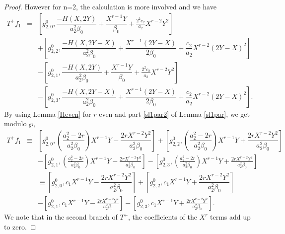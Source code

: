 \documentclass[10pt,a4paper]{amsart}
\begin{document}
\begin{proof}
However for n=2, the calculation is more involved and we have
\begin{eqnarray*}
    T^{+}f_{1} &=& \left[g_{2,0}^{0}, \dfrac{-H(X,2Y)}{a_{2}^2\beta_{0}}+\dfrac{X^{r-1}Y}{\beta_{0}} +\frac{2^2c_{2}}{a_{2}}X^{r-2}Y^2\right]\\ 
    &&+ \left[g_{2,2}^{0}, \dfrac{-H(X,2Y-X)}{a_{2}^2\beta_{0}}+\dfrac{X^{r-1}(2Y-X)}{2\beta_{0}} +\dfrac{c_{2}}{a_{2}}X^{r-2}(2Y-X)^2\right] \\
    &&-\left[g_{2,1}^{0}, \dfrac{-H(X,2Y)}{a_{2}^2\beta_{0}}+\dfrac{X^{r-1}Y}{\beta_{0}}+\frac{2^2c_{2}}{a_2}X^{r-2}Y^2\right] \\ 
    &&-\left[g_{2,3}^{0}, \dfrac{-H(X,2Y-X)}{a_{2}^2\beta_{0}}+\dfrac{X^{r-1}(2Y-X)}{2\beta_{0}}+\dfrac{c_{2}}{a_{2}}X^{r-2}(2Y-X)^2\right]. 
\end{eqnarray*}
By using Lemma \ref{Heven} for $r$ even and part \eqref{sl1par2} of Lemma \ref{sl1par}, we get modulo $\wp$,
\begin{eqnarray}\label{F2'T+f1}
T^{+}f_{1}&\equiv &\left[ g_{2,0}^{0}, \left( \dfrac{a_{2}^2-2r}{a_{2}^2\beta_{0}}\right)X^{r-1}Y-\dfrac{2rX^{r-2}Y^2}{a_{2}^2\beta_{0}}  \right] + \left[ g_{2,2}^{0}, \left( \dfrac{a_{2}^2-2r}{a_{2}^2\beta_{0}}\right)X^{r-1}Y+\dfrac{2rX^{r-2}Y^2}{a_{2}^2\beta_{0}}  \right] \nonumber\\
 && - \left[ g_{2,1}^{0},  \left( \frac{a_{2}^2-2r}{a_{2}^2\beta_{0}}\right)X^{r-1}Y-\frac{2rX^{r-2}Y^2}{a_{2}^2\beta_{0}}\right] - \left[ g_{2,3}^{0},  \left( \frac{a_{2}^2-2r}{a_{2}^2\beta_{0}}\right)X^{r-1}Y+\frac{2rX^{r-2}Y^2}{a_{2}^2\beta_{0}}  \right] \nonumber\\
 && \equiv \left[ g_{2,0}^{0},  c_{1}X^{r-1}Y-\dfrac{2rX^{r-2}Y^2}{a_{2}^2\beta_{0}}  \right] + \left[ g_{2,2}^{0},  c_{1}X^{r-1}Y+\dfrac{2rX^{r-2}Y^2}{a_{2}^2\beta_{0}}  \right] \nonumber\\
 && - \left[ g_{2,1}^{0},   c_{1}X^{r-1}Y-\frac{2rX^{r-2}Y^2}{a_{2}^2\beta_{0}}\right] - \left[ g_{2,3}^{0}, c_{1}X^{r-1}Y+\frac{2rX^{r-2}Y^2}{a_{2}^2\beta_{0}}  \right].
 \end{eqnarray}
We note that in the second branch of $T^{+}$, the coefficients of the $X^{r}$ terms add up to zero.



\end{proof}
\end{document}
